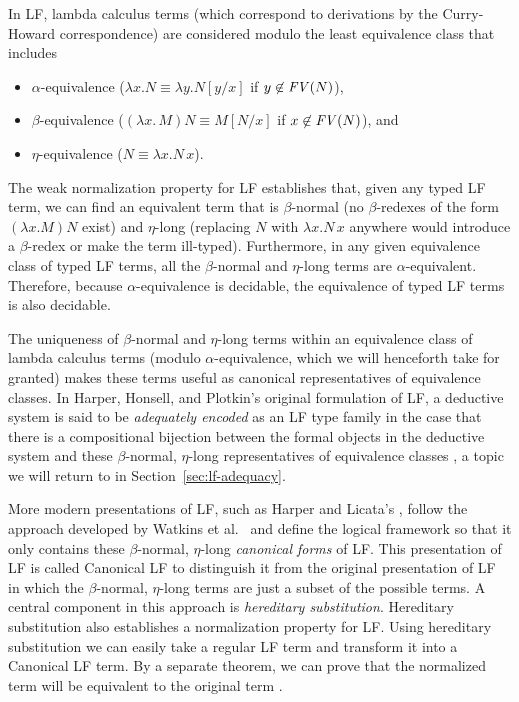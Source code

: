 In LF, lambda calculus terms (which correspond to derivations by the
Curry-Howard correspondence) are considered modulo the least
equivalence class that includes
\begin{itemize}
\item $\alpha$-equivalence ($\lambda x.N \equiv \lambda y.N[y/x]$ if 
$y \not\in {\it FV}(N)$), 
\item $\beta$-equivalence 
($(\lambda x.\,M)N \equiv M[N/x]$ if $x \not\in {\it FV}(N)$), and 
\item $\eta$-equivalence ($N \equiv \lambda x.N\,x$).
\end{itemize}
The weak normalization property for LF establishes that, given any
typed LF term, we can find an equivalent term that is $\beta$-normal
(no $\beta$-redexes of the form $(\lambda x.M) N$ exist) and
$\eta$-long (replacing $N$ with $\lambda x.N\,x$ anywhere would
introduce a $\beta$-redex or make the term ill-typed).  Furthermore,
in any given equivalence class of typed LF terms, all the
$\beta$-normal and $\eta$-long terms are $\alpha$-equivalent.
Therefore, because $\alpha$-equivalence is decidable, the equivalence
of typed LF terms is also decidable. 

The uniqueness of $\beta$-normal and $\eta$-long terms within an
equivalence class of lambda calculus terms (modulo
$\alpha$-equivalence, which we will henceforth take for granted) makes
these terms useful as canonical representatives of equivalence
classes. In Harper, Honsell, and Plotkin's original formulation
of LF, a deductive system is said to be {\it adequately encoded} as
an LF type family in the case that there is a compositional bijection
between the formal objects in the deductive system and these
$\beta$-normal, $\eta$-long representatives of equivalence classes
\cite{harper93framework}, a topic we will return to in 
Section~\ref{sec:lf-adequacy}.

More modern presentations of LF, such as Harper and Licata's
\cite{harper07mechanizing}, follow the approach developed by Watkins
et al.~\cite{watkins02concurrent} and define the logical framework so
that it only contains these $\beta$-normal, $\eta$-long {\it canonical
  forms} of LF. This presentation of LF is called Canonical LF to
distinguish it from the original presentation of LF in which the
$\beta$-normal, $\eta$-long terms are just a subset of the possible
terms. A central component in this approach is {\it hereditary
  substitution}.  Hereditary substitution also establishes a
normalization property for LF. Using hereditary substitution we can
easily take a regular LF term and transform it into a Canonical LF
term. By a separate theorem, we can prove that the normalized term
will be equivalent to the original term
\cite{martens12lf}. %

